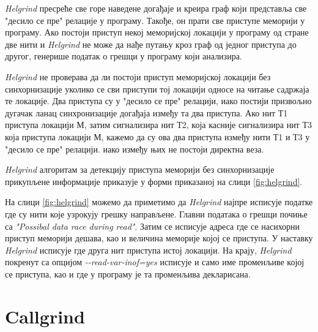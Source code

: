 \documentclass[12pt,oneside]{memoir}
\begin{document}
\indent \textit{Helgrind} пресреће све горе наведене догађаје и креира граф који представља све "десило се пре" релације у програму. Такође, он прати све приступе меморији у програму. Ако постоји приступ некој меморијској локацији у програму од стране две нити и \textit{Helgrind} не може да нађе путању кроз граф од једног приступа до другог, генерише податак о грешци у програму који анализира.

\indent \textit{Helgrind} не проверава да ли постоји приступ меморијској локацији без синхорнизације уколико се сви приступи тој локацији односе на читање садржаја те локације. Два приступа су у "десило се пре" релацији, иако постији призвољно дугачак ланац синхронизације догађаја између та два приступа. Ако нит Т1 приступа локацији М, затим сигнализира нит Т2, која касније сигнализира нит Т3 која приступа локацији М, кажемо да су ова два приступа између нити Т1 и Т3 у "десило се пре" релацији. иако између њих не постоји директна веза.

\indent \textit{Helgrind} алгоритам за детекцију приступа меморији без синхорнизације прикупљене информације приказује у форми приказаној на слици \ref{fig:helgrind}. 

\indent На слици \ref{fig:helgrind} можемо да приметимо да \textit{Helgrind} најпре исписује податке где су нити које узрокују грешку направљене. Главни података о грешци почиње са \textit{"Possibal data race during read"}. Затим се исписује адреса где се насихорни приступ меморији дешава, као и величина меморије којој се приступа. У наставку \textit{Helgrind} исписује где друга нит приступа истој локацији. На крају, \textit{Helgrind} покренут са опцијом \textit{-\--read-var-inof=yes} исписује и само име променљиве којој се приступа, као и где у програму је та променљива декларисана.



\section{Callgrind}
\end{document}

